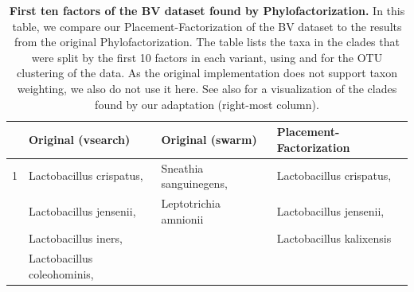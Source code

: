 \begin{table}[!tbp]
\caption[First ten factors of the \acs{BV} dataset found by Phylofactorization]{
\textbf{First ten factors of the \acs{BV} dataset found by Phylofactorization.}
In this table, we compare our Placement-Factorization of the \ac{BV} dataset
to the results from the original Phylofactorization.
The table lists the taxa in the clades that were split by the first \num{10} factors in each variant,
using  and  for the OTU clustering of the data.
As the original implementation does not support taxon weighting, we also do not use it here.
See also  for a visualization of the clades found by our adaptation (right-most column).
%
}
\label{tab:bv_phylofactor_clades}
{
    \newcommand{\rc}{\rowcolor{black!12}}
    \small
    \begin{center}
    \begin{tabular}{rlll}
        \toprule
             &  Original (vsearch)          & Original (swarm)        & Placement-Factorization   \\
        \midrule
\rc{}   1    & Lactobacillus crispatus,     & Sneathia sanguinegens,  & Lactobacillus crispatus,   \\
\rc{}        & Lactobacillus jensenii,      & Leptotrichia amnionii   & Lactobacillus jensenii,    \\
\rc{}        & Lactobacillus iners,         &                         & Lactobacillus kalixensis   \\
\rc{}        & Lactobacillus coleohominis,  &                         &     \\

\end{tabular}
\end{center}}
\end{table}

